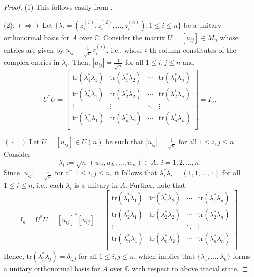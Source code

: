 \documentclass{amsart}
\theoremstyle{definition}
\theoremstyle{theorem}
\newcommand{\C}{\mathbb{C}}
\newcommand{\tr}{\mathrm{tr}}
\begin{document}
 \begin{proof} 
   (1) This follows easily from \cite[Proposition 2.7.2]{GHJ}. 

   \smallskip
   
 \noindent (2):   $(\Rightarrow)$ Let $\{\lambda_i=(z_i^{(1)}, z_i^{(2)},
   \ldots, z_i^{(n)}) : 1 \leq i \leq n\}$ be a unitary orthonormal
   basis for $A$ over $\C$. Consider the matrix \( U =[u_{ij}] \in M_n
   \) whose entries are given by \( u_{ij}=
   \frac{1}{\sqrt{n}}z_{i}^{(j)} \), i.e., whose $i$-th column
   constitutes of the complex entries in $\lambda_i$. Then,
   $|u_{ij}|=\frac{1}{\sqrt{n}}$ for all $1 \leq i, j \leq n$ and
\[
U^*U= \begin{bmatrix}
\tr(\lambda_1^*\lambda_1) & \tr(\lambda_1^*\lambda_2) & \cdots & \tr(\lambda_1^*\lambda_n)\\
\tr(\lambda_2^*\lambda_1) & \tr(\lambda_2^*\lambda_2) & \cdots & \tr(\lambda_2^*\lambda_n)\\
\vdots & \vdots & \ddots & \vdots \\
\tr(\lambda_n^*\lambda_1) & \tr(\lambda_n^*\lambda_2) & \cdots & \tr(\lambda_n^*\lambda_n)\\
\end{bmatrix}=  I_n.
\]


\noindent $(\Leftarrow)$ Let $U=[u_{ij}]\in U(n)$ be such that $
|u_{ij}| = \frac{1}{\sqrt{n}}$ for all $1 \leq i, j \leq n$. Consider \[
\lambda_i := \sqrt{n}\, (u_{1i}, u_{2i}, \ldots, u_{ni}) \in A,\ i =1 , 2, \ldots, n.
\]
Since
$|u_{ij}| = \frac{1}{\sqrt{n}}$ for all $1 \leq i , j \leq n$, it
follows that $\lambda_i^*\lambda_i=(1, 1, \ldots, 1)$ for all $1 \leq
i \leq n$, i.e., each $\lambda_i$ is a unitary in $A$. 
Further, note that
\[
I_n= U^*U = [u_{ij}]^*[u_{ij}] =
\begin{bmatrix}
\tr(\lambda_1^*\lambda_1) & \tr(\lambda_1^*\lambda_2) & \cdots & \tr(\lambda_1^*\lambda_n)\\
\tr(\lambda_2^*\lambda_1) & \tr(\lambda_2^*\lambda_2) & \cdots & \tr(\lambda_2^*\lambda_n)\\
\vdots & \vdots & \ddots & \vdots \\
\tr(\lambda_n^*\lambda_1) & \tr(\lambda_n^*\lambda_2) & \cdots & \tr(\lambda_n^*\lambda_n)\\
\end{bmatrix}.
\]
Hence, $\tr(\lambda_i^*\lambda_j) = \delta_{i,j}$ for all $ 1 \leq i,
j \leq n$, which implies that $\{\lambda_1, \ldots, \lambda_n\}$ forms
a unitary orthonormal basis for $A$ over $\C$ with respect to above
tracial state.
 \end{proof}
\end{document}
